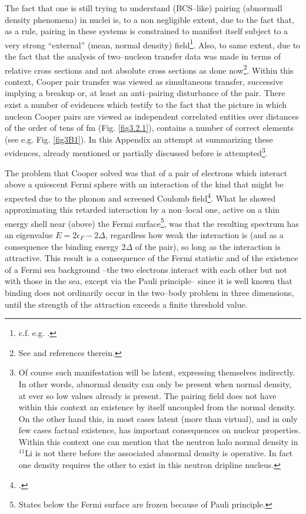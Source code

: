 \begin{subappendices}
The fact that one is still trying to understand (BCS--like) pairing (abnormall density phenomena) in nuclei is, to a non negligible extent, due to the fact that, as a rule, pairing in these systems is constrained to manifest itself subject to a very strong ``external'' (mean, normal density) field\footnote{c.f. e.g. \cite{Matsuo:13}.}. Also, to same extent, due to the fact that the analysis of two--nucleon transfer data was made in terms of relative cross sections and not absolute cross sections as done now\footnote{See \cite{Potel:13} and references therein.}. Within this context, Cooper pair transfer was viewed as simultaneous transfer, successive implying a breakup or, at least an anti--pairing disturbance of the pair. There exist a number of evidences which testify to the fact that the picture in which nucleon Cooper pairs are viewed as independent correlated entities over distances of the order of tens of fm (Fig. \ref{fig3.2.1}), contains a number of correct elements (see e.g. Fig. \ref{fig3B1}). In this Appendix an attempt at summarizing these evidences, already mentioned or partially discussed before is attempted\footnote{Of course such manifestation will be latent, expressing themselves indirectly. In other words, abnormal density can only be present when normal density, at ever so low values already is present. The pairing field does not have within this context an existence by itself uncoupled from the normal density. On the other hand this, in most cases latent (more than virtual), and in only few cases factual existence, has important consequences on nuclear properties. Within this context one can mention that the neutron halo normal density in $^{11}$Li is not there before the associated abnormal density is operative. In fact one density requires the other to exist in this neutron dripline nucleus.}.


 The problem that Cooper solved was that of a pair of electrons which interact above a quiescent Fermi sphere with  an interaction of the kind that might be expected due to the phonon and screened Coulomb field\footnote{\cite{Cooper:56}.}. What he showed approximating this retarded interaction by a non--local one, active on a thin energy shell near (above) the Fermi surface\footnote{States below the Fermi surface are frozen because of Pauli principle.}, was that the resulting spectrum has an eigenvalue $E=2\epsilon_F-2\Delta$, regardless how weak the interaction is (and as a consequence the binding energy $2\Delta$ of the pair), so long as the interaction is attractive. This result is a consequence of the Fermi statistic and of the existence of a Fermi sea background --the two electrons interact with each other but not with those in the sea, except via the Pauli principle-- since it is well known that binding does not ordinarily occur in the two--body problem in three dimensions, until the strength of the attraction exceeds a finite threshold value.


\end{subappendices}
